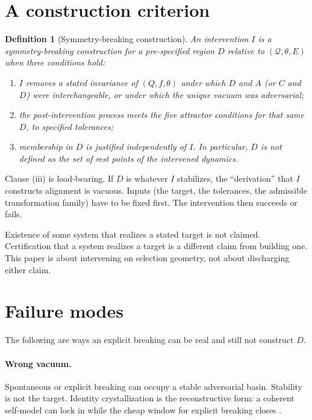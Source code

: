 \documentclass[11pt]{article}
\newtheorem{definition}{Definition}
\newcommand{\Q}{\mathcal{Q}}
\begin{document}
\section{A construction criterion}

\begin{definition}[Symmetry-breaking construction]
An intervention \(I\) is a \emph{symmetry-breaking construction} for a pre-specified region \(D\) relative to \((\Q,\theta,E)\) when three conditions hold:
\begin{enumerate}[label=(\roman*)]
    \item \(I\) removes a stated invariance of \((Q,f,\theta)\) under which \(D\) and \(A\) (or \(C\) and \(D\)) were interchangeable, or under which the unique vacuum was adversarial;
    \item the post-intervention process meets the five attractor conditions for that same \(D\), to specified tolerances;
    \item membership in \(D\) is justified independently of \(I\). In particular, \(D\) is not defined as the set of rest points of the intervened dynamics.
\end{enumerate}
\end{definition}

Clause (iii) is load-bearing. If \(D\) is whatever \(I\) stabilizes, the ``derivation'' that \(I\) constructs alignment is vacuous. Inputs (the target, the tolerances, the admissible transformation family) have to be fixed first. The intervention then succeeds or fails.

Existence of some system that realizes a stated target is not claimed. Certification that a system realizes a target is a different claim from building one. This paper is about intervening on selection geometry, not about discharging either claim.

\section{Failure modes}

The following are ways an explicit breaking can be real and still not construct \(D\).

\paragraph{Wrong vacuum.}
Spontaneous or explicit breaking can occupy a stable adversarial basin. Stability is not the target. Identity crystallization is the reconstructive form: a coherent self-model can lock in while the cheap window for explicit breaking closes \parencite{douglas2026self}.
\end{document}
